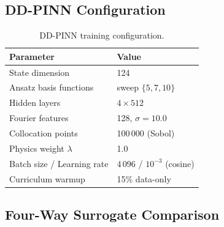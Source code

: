 \documentclass[11pt]{article}
\begin{document}
\subsection{DD-PINN Configuration}
\label{sec:pinn:config}

\begin{table}[H]
\centering
\small
\renewcommand{\arraystretch}{1.15}
\caption{DD-PINN training configuration.}
\label{tab:pinn:config}
\begin{tabular}{@{} l l @{}}
\toprule
\textbf{Parameter} & \textbf{Value} \\
\midrule
State dimension       & 124 \\
Ansatz basis functions & sweep $\{5, 7, 10\}$ \\
Hidden layers         & $4 \times 512$ \\
Fourier features      & 128, $\sigma = 10.0$ \\
Collocation points    & 100\,000 (Sobol) \\
Physics weight $\lambda$ & 1.0 \\
Batch size / Learning rate & 4\,096 / $10^{-3}$ (cosine) \\
Curriculum warmup     & 15\% data-only \\
\bottomrule
\end{tabular}
\end{table}

\subsection{Four-Way Surrogate Comparison}
\label{sec:pinn:four-way}
\end{document}
